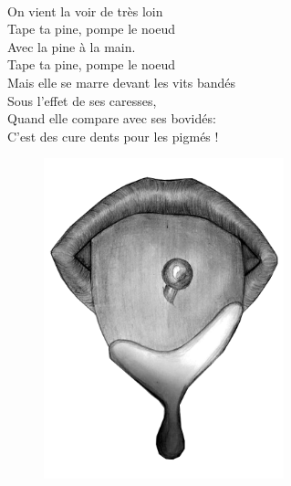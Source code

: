 \\On vient la voir de très loin 
\\ Tape ta pine, pompe le noeud
\\Avec la pine à la main. 
\\ Tape ta pine, pompe le noeud
\\Mais elle se marre devant les vits bandés
\\Sous l'effet de ses caresses,
\\Quand elle compare avec ses bovidés:
\\C'est des cure dents pour les pigmés !
\begin{figure}[h!]
\centering
   \includegraphics[width=0.62\textwidth]{images/taureau.png}
 \end{figure}
 
 \breakpage